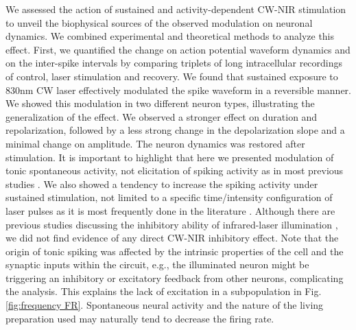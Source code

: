 We assessed the action of sustained and activity-dependent CW-NIR stimulation to unveil the biophysical sources of the observed modulation on neuronal dynamics. We combined experimental and theoretical methods to analyze this effect. First, we quantified the change on action potential waveform dynamics and on the inter-spike intervals by comparing triplets of long intracellular recordings of control, laser stimulation and recovery. We found that sustained exposure to 830nm CW laser effectively modulated the spike waveform in a reversible manner. We showed this modulation in two different neuron types, illustrating the generalization of the effect. We observed a stronger effect on duration and repolarization, followed by a less strong change in the depolarization slope and a minimal change on amplitude. The neuron dynamics was restored after stimulation. It is important to highlight that here we presented modulation of tonic spontaneous activity, not elicitation of spiking activity as in most previous studies \parencite{wells_application_2005,izzo_optical_2007,shapiro_infrared_2012,rabbitt_heat_2016}. We also showed a tendency to increase the spiking activity under sustained stimulation, not limited to a specific time/intensity configuration of laser pulses as it is most frequently done in the literature \parencite{izzo_optical_2007,goyal_acute_2012,beier_plasma_2014,pan_infrared_2023}. Although there are previous studies discussing the inhibitory ability of infrared-laser illumination \parencite{duke_transient_2013,lothet_selective_2017,ganguly_thermal_2019, begeng_activity_2022}, we did not find evidence of any direct CW-NIR inhibitory effect. Note that the origin of tonic spiking was affected by the intrinsic properties of the cell and the synaptic inputs within the circuit, e.g., the illuminated neuron might be triggering an inhibitory or excitatory feedback from other neurons, complicating the analysis. This explains the lack of excitation in a subpopulation in Fig. \ref{fig:frequency FR}. Spontaneous neural activity and the nature of the living preparation used may naturally tend to decrease the firing rate.

